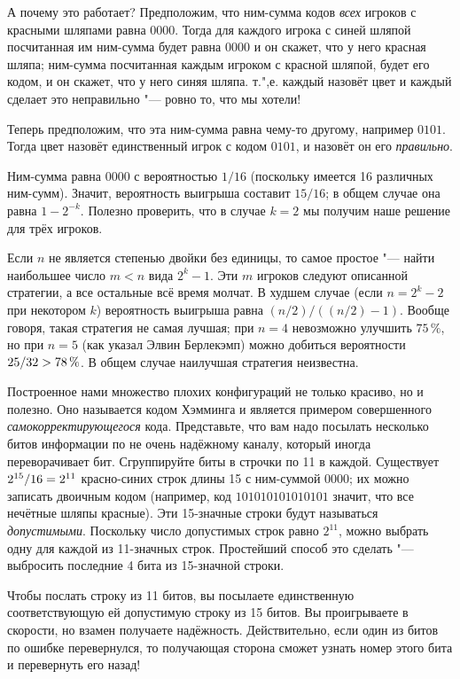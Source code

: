 \documentclass[twoside]{book}
\begin{document}
А почему это работает?
Предположим, что ним-сумма кодов \emph{всех} игроков с красными шляпами равна $0000$.
Тогда для каждого игрока с синей шляпой посчитанная им ним-сумма будет равна $0000$ и он скажет, что у него красная шляпа;
ним-сумма посчитанная каждым игроком с красной шляпой, будет его кодом, и он скажет, что у него синяя шляпа.
т.",е. каждый назовёт цвет и каждый сделает это неправильно "--- ровно то, что мы хотели!

Теперь  предположим, что эта ним-сумма равна чему-то другому, например $0101$.
Тогда цвет назовёт единственный игрок с кодом  $0101$, и назовёт он его \emph{правильно}.

Ним-сумма равна $0000$ с вероятностью $1/16$ (поскольку имеется 16 различных ним-сумм).
Значит, вероятность выигрыша составит $15/16$;
в общем случае она равна $1-2^{-k}$.
Полезно проверить, что в случае $k=2$ мы получим наше решение для трёх игроков.

Если $n$ не является степенью двойки без единицы, то самое простое "--- найти наибольшее число $m<n$ вида $2^k-1$.
Эти $m$ игроков следуют описанной стратегии, а все остальные всё время молчат.
В худшем случае (если $n=2^k-2$ при некотором $k$) вероятность выигрыша равна $(n/2)/((n/2)-1)$.
Вообще говоря, такая стратегия не самая лучшая;
при $n=4$ невозможно улучшить $75\,\%$, но при $n=5$ (как указал Элвин Берлекэмп) можно добиться вероятности $25/32\z>78\,\%$.
В общем случае наилучшая стратегия неизвестна.
\heart

Построенное нами множество плохих конфигураций не только красиво, но и полезно.
Оно называется кодом Хэмминга и является примером совершенного \emph{самокорректирующегося} кода.
Представьте, что вам надо посылать несколько битов информации по не очень надёжному каналу, который иногда переворачивает бит.
Сгруппируйте биты в строчки по 11 в каждой.
Существует $2^{15}/16\z=2^{11}$ красно-синих строк длины 15 с ним-суммой $0000$;
их можно записать двоичным кодом (например, код $101010101010101$ значит, что все нечётные шляпы красные).
Эти 15-значные строки будут называться \emph{допустимыми}.
Поскольку число допустимых строк равно $2^{11}$, можно выбрать одну для каждой из 11-значных строк.
Простейший способ это сделать "--- выбросить последние 4 бита из 15-значной строки.

Чтобы послать строку из 11 битов, вы посылаете единственную соответствующую ей допустимую строку из 15 битов.
Вы проигрываете в скорости, но взамен получаете надёжность.
Действительно, если один из битов по ошибке перевернулся, то получающая сторона сможет узнать номер этого бита и перевернуть его назад!
\end{document}
